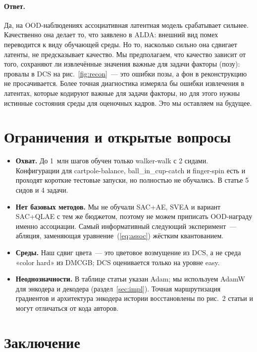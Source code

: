 \documentclass{article}
\theoremstyle{plain}
\theoremstyle{definition}
\theoremstyle{remark}
\begin{document}
\paragraph{Ответ.} Да, на OOD-наблюдениях ассоциативная латентная модель
срабатывает сильнее. Качественно она делает то, что заявлено в ALDA: внешний
вид помех переводится к виду обучающей среды. Но то, насколько сильно она
сдвигает латенты, не предсказывает качество. Мы предполагаем, что качество
зависит от того, сохраняют ли извлечённые значения важные для задачи факторы
(позу): провалы в DCS на рис.~\ref{fig:recon}~--- это ошибки позы, а фон в
реконструкцию не просачивается. Более точная диагностика измеряла бы ошибки
извлечения в латентах, которые кодируют важные для задачи факторы, но для
этого нужны истинные состояния среды для оценочных кадров. Это мы оставляем
на будущее.

\section{Ограничения и открытые вопросы}
\label{sec:limits}

\begin{itemize}
\item \textbf{Охват.} До 1~млн шагов обучен только walker-walk с 2 сидами.
  Конфигурации для cartpole-balance, ball\_in\_cup-catch и finger-spin есть и
  проходят короткие тестовые запуски, но полностью не обучались. В статье
  5 сидов и 4 задачи.
\item \textbf{Нет базовых методов.} Мы не обучали SAC+AE, SVEA и вариант
  SAC+QLAE с тем же бюджетом, поэтому не можем приписать OOD-награду именно
  ассоциации. Самый информативный следующий эксперимент~--- абляция,
  заменяющая уравнение~(\ref{eq:assoc}) жёстким квантованием.
\item \textbf{Среды.} Наш сдвиг цвета~--- это цветовое возмущение из DCS, а
  не среда «color hard» из DMCGB; DCS оценивается только на уровне easy.
\item \textbf{Неоднозначности.} В таблице статьи указан Adam; мы используем
  AdamW для энкодера и декодера (раздел~\ref{sec:impl}). Точная маршрутизация
  градиентов и архитектура энкодера истории восстановлены по рис.~2 статьи и
  могут отличаться от кода авторов.
\end{itemize}

\section{Заключение}
\end{document}
